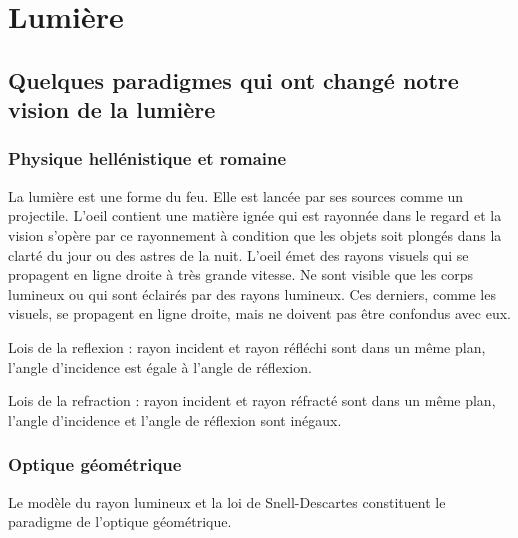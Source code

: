 \chapter{Lumière}

\section{Quelques paradigmes qui ont changé notre vision de la lumière}

\subsection{Physique hellénistique et romaine}

La lumière est une forme du feu. Elle est lancée par ses sources comme un projectile. L'oeil contient une matière ignée qui est rayonnée dans le regard et la vision s'opère par ce rayonnement à condition que les objets soit plongés dans la clarté du jour ou des astres de la nuit.
L'oeil émet des rayons visuels qui se propagent en ligne droite à très grande vitesse. Ne sont visible que les corps lumineux ou qui sont éclairés par des rayons lumineux. Ces derniers, comme les visuels, se propagent en ligne droite, mais ne doivent pas être confondus avec eux.

Lois de la reflexion : rayon incident et rayon réfléchi sont dans un même plan, l'angle d'incidence est égale à l'angle de réflexion.

Lois de la refraction : rayon incident et rayon réfracté sont dans un même plan, l'angle d'incidence et l'angle de réflexion sont inégaux. 


\subsection{Optique géométrique}
Le modèle du rayon lumineux et la loi de Snell-Descartes constituent le paradigme de l'optique géométrique.

\begin{center}
\end{center}

\begin{center}
\end{center}

